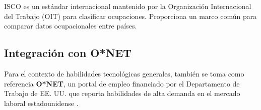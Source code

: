 ISCO es un estándar internacional mantenido por la Organización Internacional del Trabajo (OIT) para clasificar ocupaciones. Proporciona un marco común para comparar datos ocupacionales entre países.

\subsection{Integración con O*NET}

Para el contexto de habilidades tecnológicas generales, también se toma como referencia \textbf{O*NET}, un portal de empleo financiado por el Departamento de Trabajo de EE. UU. que reporta habilidades de alta demanda en el mercado laboral estadounidense \parencite{rubio2024}.
